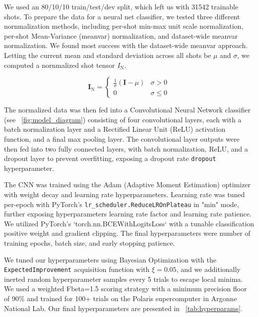\documentclass[twocolumn]{article}
\begin{document}
We used an 80/10/10 train/test/dev split, which left us with 31542 trainable shots. To prepare the data for a neural net classifier, we tested three different nornmalization methods, including per-shot min-max unit scale normalization,  per-shot Mean-Variance (meanvar) normalization, and dataset-wide meanvar normalization. We found most success with the dataset-wide meanvar approach. Letting the current mean and standard deviation across all shots be $\mu$ and $\sigma$, we computed a nornmalized shot tensor $I_\mathrm{N}$. 

\begin{equation}
  \label{current_norm}
\mathbf{I}_{\mathrm{N}} =
\begin{cases}
\frac{1}{\sigma}(\mathbf{I} - \mu) & \sigma > 0 \\[0.5em]
  0 & \sigma \leq 0  
\end{cases}  
\end{equation}

The normalized data was then fed into a Convolutional Neural Network classifier (see ~\ref{fig:model_diagram}) consisting of four convolutional layers, each with a batch normalization layer and a Rectified Linear Unit (ReLU) activation function, and a final max pooling layer. The convolutional layer outputs were then fed into two fully connected layers, with batch normalization, ReLU, and a dropout layer to prevent overfitting, exposing a dropout rate \verb|dropout| hyperparameter. 

The CNN was trained using the Adam (Adaptive Moment Estimation) optimizer with weight decay and learning rate hyperparameters. Learning rate was tuned per-epoch with PyTorch's \verb|lr_scheduler.ReduceLROnPlateau| in "min" mode, further exposing hyperparameters learning rate factor and learning rate patience. We utilized PyTorch's `torch.nn.BCEWithLogitsLoss` with a tunable classification positive weight and gradient clipping. The final hyperparameters were number of training epochs, batch size, and early stopping patience.

We tuned our hyperparameters using Bayesian Optimization with the \verb|ExpectedImprovement| acquisition function with $\xi=0.05$, and we additionally inerted random hyperparameter samples every 5 trials to escape local minima. We used a weighted Fbeta=1.5 scoring strategy with a minimum precision floor of 90\% and trained for 100+ trials on the Polaris supercomputer in Argonne National Lab. Our final hyperparameters are presented in ~\ref{tab:hyperparams}. 
          
\end{document}
